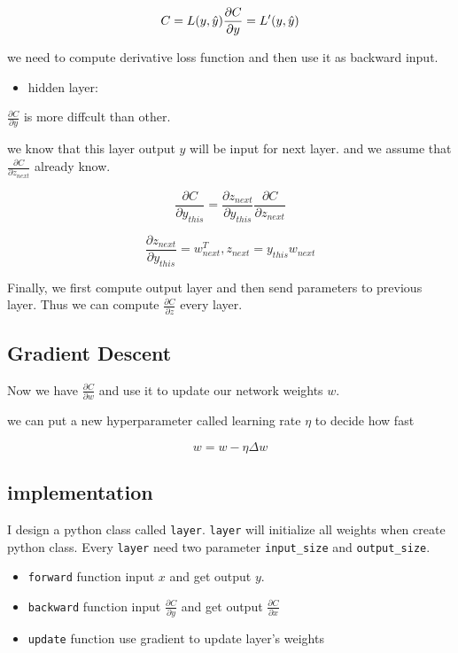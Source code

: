 \documentclass[11pt]{article}
\providecommand{\tightlist}{%
      \setlength{\itemsep}{0pt}\setlength{\parskip}{0pt}}
\begin{document}
\[ C = L(y, \hat{y}) \\ \frac{\partial C}{\partial y} = L'(y, \hat{y}) \]

we need to compute derivative loss function and then use it as backward
input.

\begin{itemize}
\tightlist
\item
  hidden layer:
\end{itemize}

\(\frac{\partial C}{\partial y}\) is more diffcult than other.

we know that this layer output \(y\) will be input for next layer. and
we assume that \(\frac{\partial C}{\partial z_{next}}\) already know.

\[\frac{\partial C}{\partial y_{this}} = \frac{\partial z_{next}}{\partial y_{this}}\frac{\partial C}{\partial z_{next}} \]

\[ \frac{\partial z_{next}}{\partial y_{this}} = w_{next}^T , z_{next} = y_{this}w_{next}\]

Finally, we first compute output layer and then send parameters to
previous layer. Thus we can compute \(\frac{\partial C}{\partial z}\)
every layer.

\hypertarget{gradient-descent}{%
\subsection{Gradient Descent}\label{gradient-descent}}

Now we have \(\frac{\partial C}{\partial w}\) and use it to update our
network weights \(w\).

we can put a new hyperparameter called learning rate \(\eta\) to decide
how fast

\[ w = w - \eta \Delta w\]

    \hypertarget{implementation}{%
\subsection{implementation}\label{implementation}}

I design a python class called \texttt{layer}. \texttt{layer} will
initialize all weights when create python class. Every \texttt{layer}
need two parameter \texttt{input\_size} and \texttt{output\_size}.

\begin{itemize}
\item
  \texttt{forward} function input \(x\) and get output \(y\).
\item
  \texttt{backward} function input \(\frac{\partial C}{\partial y}\) and
  get output \(\frac{\partial C}{\partial x}\)
\item
  \texttt{update} function use gradient to update layer's weights
\end{itemize}
\end{document}
